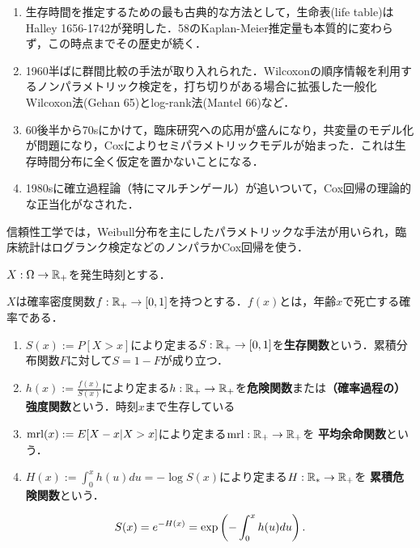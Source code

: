 \documentclass[uplatex,dvipdfmx]{jsreport}
\begin{document}
\begin{history}\mbox{}
    \begin{enumerate}
        \item 生存時間を推定するための最も古典的な方法として，生命表(life table)はHalley 1656-1742が発明した．58のKaplan-Meier推定量も本質的に変わらず，この時点までその歴史が続く．
        \item 1960半ばに群間比較の手法が取り入れられた．Wilcoxonの順序情報を利用するノンパラメトリック検定を，打ち切りがある場合に拡張した一般化Wilcoxon法(Gehan 65)とlog-rank法(Mantel 66)など．
        \item 60後半から70sにかけて，臨床研究への応用が盛んになり，共変量のモデル化が問題になり，Coxによりセミパラメトリックモデルが始まった．これは生存時間分布に全く仮定を置かないことになる．
        \item 1980sに確立過程論（特にマルチンゲール）が追いついて，Cox回帰の理論的な正当化がなされた．
    \end{enumerate}
    信頼性工学では，Weibull分布を主にしたパラメトリックな手法が用いられ，臨床統計はログランク検定などのノンパラかCox回帰を使う．
\end{history}

\begin{notation}
    $X:\Omega\to\mathbb{R}_+$を発生時刻とする．
\end{notation}

\begin{definition}
    $X$は確率密度関数$f:\mathbb{R}_+\to[0,1]$を持つとする．$f(x)$とは，年齢$x$で死亡する確率である．
    \begin{enumerate}
        \item $S(x):=P[X>x]$により定まる$S:\mathbb{R}_+\to[0,1]$を\textbf{生存関数}という．累積分布関数$F$に対して$S=1-F$が成り立つ．
        \item $h(x):=\frac{f(x)}{S(x)}$により定まる$h:\mathbb{R}_+\to\mathbb{R}_+$を\textbf{危険関数}または\textbf{（確率過程の）強度関数}という．時刻$x$まで生存している
        \item $\mathrm{mrl}(x):=E[X-x|X>x]$により定まる$\mathrm{mrl}:\mathbb{R}_+\to\mathbb{R}_+$を
        \textbf{平均余命関数}という．
        \item $H(x):=\int^x_0h(u)du=-\log S(x)$により定まる$H:\mathbb{R}_*\to\mathbb{R}_+$を
        \textbf{累積危険関数}という．
    \end{enumerate}
\end{definition}

\begin{proposition}
    \[S(x)=e^{-H(x)}=\exp\left(-\int^x_0h(u)du\right).\]
\end{proposition}
\end{document}

